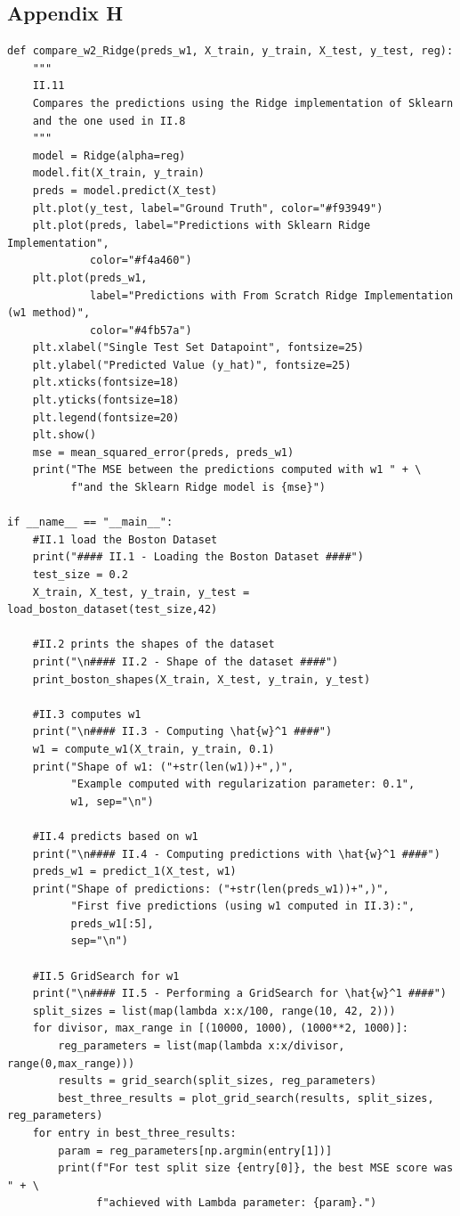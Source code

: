 \documentclass{homework}
\begin{document}
\subsection*{Appendix H}
\lstset{language=Python}
\lstset{frame=lines}
\lstset{basicstyle=\footnotesize}
\begin{lstlisting}
def compare_w2_Ridge(preds_w1, X_train, y_train, X_test, y_test, reg):
    """
    II.11
    Compares the predictions using the Ridge implementation of Sklearn
    and the one used in II.8
    """
    model = Ridge(alpha=reg)
    model.fit(X_train, y_train)
    preds = model.predict(X_test)
    plt.plot(y_test, label="Ground Truth", color="#f93949")
    plt.plot(preds, label="Predictions with Sklearn Ridge Implementation", 
             color="#f4a460")
    plt.plot(preds_w1, 
             label="Predictions with From Scratch Ridge Implementation (w1 method)", 
             color="#4fb57a")
    plt.xlabel("Single Test Set Datapoint", fontsize=25)
    plt.ylabel("Predicted Value (y_hat)", fontsize=25)
    plt.xticks(fontsize=18)
    plt.yticks(fontsize=18)
    plt.legend(fontsize=20)
    plt.show()
    mse = mean_squared_error(preds, preds_w1)
    print("The MSE between the predictions computed with w1 " + \ 
          f"and the Sklearn Ridge model is {mse}")

if __name__ == "__main__":
    #II.1 load the Boston Dataset
    print("#### II.1 - Loading the Boston Dataset ####")
    test_size = 0.2
    X_train, X_test, y_train, y_test = load_boston_dataset(test_size,42)

    #II.2 prints the shapes of the dataset
    print("\n#### II.2 - Shape of the dataset ####")
    print_boston_shapes(X_train, X_test, y_train, y_test)

    #II.3 computes w1
    print("\n#### II.3 - Computing \hat{w}^1 ####")
    w1 = compute_w1(X_train, y_train, 0.1)
    print("Shape of w1: ("+str(len(w1))+",)",
          "Example computed with regularization parameter: 0.1",
          w1, sep="\n")

    #II.4 predicts based on w1
    print("\n#### II.4 - Computing predictions with \hat{w}^1 ####")
    preds_w1 = predict_1(X_test, w1)
    print("Shape of predictions: ("+str(len(preds_w1))+",)",
          "First five predictions (using w1 computed in II.3):",
          preds_w1[:5],
          sep="\n")

    #II.5 GridSearch for w1
    print("\n#### II.5 - Performing a GridSearch for \hat{w}^1 ####")
    split_sizes = list(map(lambda x:x/100, range(10, 42, 2)))
    for divisor, max_range in [(10000, 1000), (1000**2, 1000)]:
        reg_parameters = list(map(lambda x:x/divisor, range(0,max_range)))
        results = grid_search(split_sizes, reg_parameters)
        best_three_results = plot_grid_search(results, split_sizes, reg_parameters)
    for entry in best_three_results:
        param = reg_parameters[np.argmin(entry[1])]
        print(f"For test split size {entry[0]}, the best MSE score was " + \
              f"achieved with Lambda parameter: {param}.")


\end{lstlisting}
\end{document}
